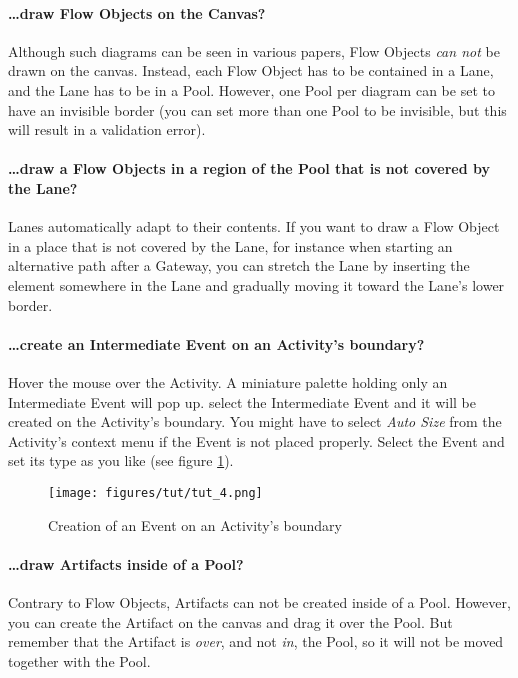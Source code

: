 \paragraph*{\dots draw Flow Objects on the Canvas?}
Although such diagrams can be seen in various papers, Flow Objects \emph{can not} be drawn on the canvas. Instead, each Flow Object has to be contained in a Lane, and the Lane has to be in a Pool. However, one Pool per diagram can be set to have an invisible border (you can set more than one Pool to be invisible, but this will result in a validation error).

\paragraph*{\dots draw a Flow Objects in a region of the Pool that is not covered by the Lane?}
Lanes automatically adapt to their contents. If you want to draw a Flow Object in a place that is not covered by the Lane, for instance when starting an alternative path after a Gateway, you can stretch the Lane by inserting the element somewhere in the Lane and gradually moving it toward the Lane's lower border.

\paragraph*{\dots create an Intermediate Event on an Activity's boundary?}
Hover the mouse over the Activity. A miniature palette holding only an Intermediate Event will pop up. select the Intermediate Event and it will be created on the Activity's boundary. You might have to select \emph{Auto Size} from the Activity's context menu if the Event is not placed properly. Select the Event and set its type as you like (see figure \ref{fig:tut_4}).

\begin{figure}[htp]
\centering
\texttt{[image: figures/tut/tut\_4.png]}
\caption{Creation of an Event on an Activity's boundary}
\label{fig:tut_4}
\end{figure}

\paragraph*{\dots draw Artifacts inside of a Pool?}
Contrary to Flow Objects, Artifacts can not be created inside of a Pool. However, you can create the Artifact on the canvas and drag it over the Pool. But remember that the Artifact is \emph{over}, and not \emph{in}, the Pool, so it will not be moved together with the Pool.

